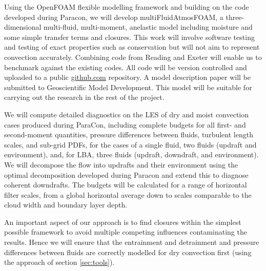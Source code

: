 \documentclass[11pt,a4paper]{article}
\begin{document}

Using the OpenFOAM flexible modelling framework and building on the code developed during Paracon, we will develop multiFluidAtmosFOAM, a three-dimensional multi-fluid, multi-moment, anelastic model including moisture and some simple transfer terms and closures. This work will involve software testing and testing of exact properties such as conservation but will not aim to represent convection accurately. Combining code from Reading and Exeter will enable us to benchmark against the existing codes. All code will be version controlled and uploaded to a public \url{github.com} repository. A model description paper will be submitted to Geoscientific Model Development. This model will be suitable for carrying out the research in the rest of the project. 



We will compute detailed diagnostics on the LES of dry and moist convection cases produced during ParaCon, including complete budgets for all first- and second-moment quantities, pressure differences between fluids, turbulent length scales, and sub-grid PDFs, for the cases of a single fluid, two fluids (updraft and environment), and, for LBA, three fluids (updraft, downdraft, and environment).
We will decompose the flow into updrafts and their environment using the optimal decomposition developed during Paracon and extend this to diagnose coherent downdrafts. The budgets will be calculated for a range of horizontal filter scales, from a global horizontal average down to scales comparable to the cloud width and boundary layer depth.



An important aspect of our approach is to find closures within the simplest possible framework to avoid multiple competing influences contaminating the results. Hence we will ensure that the entrainment and detrainment and pressure differences between fluids are correctly modelled for dry convection first (using the approach of section \ref{sec:tools}).
\end{document}
